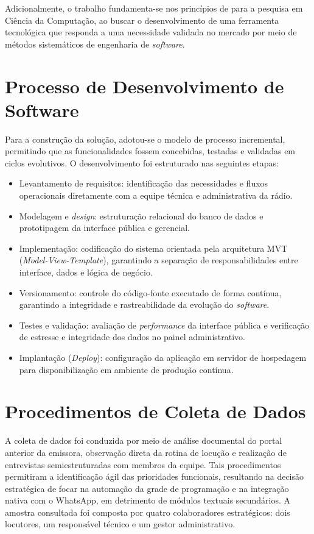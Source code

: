 \documentclass[12pt, openright, oneside, a4paper, brazil]{ads-unipac-abntex2}
\begin{document}
Adicionalmente, o trabalho fundamenta-se nos princípios de  para a pesquisa em Ciência da Computação, ao buscar o desenvolvimento de uma ferramenta tecnológica que responda a uma necessidade validada no mercado por meio de métodos sistemáticos de engenharia de \textit{software}.

\section{Processo de Desenvolvimento de Software}
Para a construção da solução, adotou-se o modelo de processo incremental, permitindo que as funcionalidades fossem concebidas, testadas e validadas em ciclos evolutivos. O desenvolvimento foi estruturado nas seguintes etapas:

\begin{itemize}
    \item Levantamento de requisitos: identificação das necessidades e fluxos operacionais diretamente com a equipe técnica e administrativa da rádio.
    \item Modelagem e \textit{design}: estruturação relacional do banco de dados e prototipagem da interface pública e gerencial.
    \item Implementação: codificação do sistema orientada pela arquitetura MVT (\textit{Model-View-Template}), garantindo a separação de responsabilidades entre interface, dados e lógica de negócio.
    \item Versionamento: controle do código-fonte executado de forma contínua, garantindo a integridade e rastreabilidade da evolução do \textit{software}.
    \item Testes e validação: avaliação de \textit{performance} da interface pública e verificação de estresse e integridade dos dados no painel administrativo.
    \item Implantação (\textit{Deploy}): configuração da aplicação em servidor de hospedagem para disponibilização em ambiente de produção contínua.
\end{itemize}

\section{Procedimentos de Coleta de Dados}
A coleta de dados foi conduzida por meio de análise documental do portal anterior da emissora, observação direta da rotina de locução e realização de entrevistas semiestruturadas com membros da equipe. Tais procedimentos permitiram a identificação ágil das prioridades funcionais, resultando na decisão estratégica de focar na automação da grade de programação e na integração nativa com o WhatsApp, em detrimento de módulos textuais secundários. A amostra consultada foi composta por quatro colaboradores estratégicos: dois locutores, um responsável técnico e um gestor administrativo.
\end{document}
